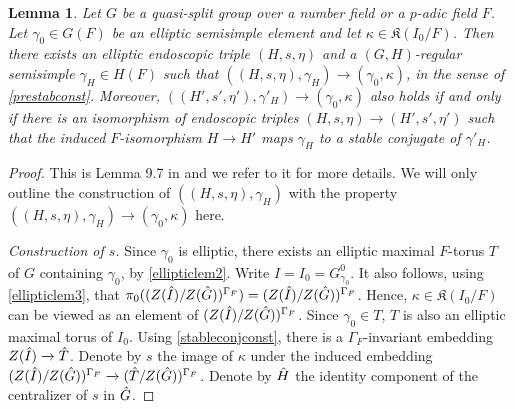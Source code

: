 \documentclass[11pt,a4paper]{article}
\theoremstyle{definition}
\theoremstyle{plain}
\newtheorem{Le}[shared]{Lemma}
\theoremstyle{remark}
\theoremstyle{plain}
\begin{document}
\begin{Le}\label{keylemma}
    Let $G$ be a quasi-split group over a number field or a $p$-adic field $F$. Let $\gamma_0 \in G(F)$ be an elliptic semisimple element and let $\kappa \in \mathfrak{K}(I_0/F)$. Then there exists an elliptic endoscopic triple $(H,s,\eta)$ and a $(G,H)$-regular semisimple $\gamma_H \in H(F)$ such that $((H,s,\eta), \gamma_H) \rightarrow (\gamma_0, \kappa)$, in the sense of \ref{prestabconst}. Moreover, $((H',s',\eta'),\gamma'_H) \rightarrow (\gamma_0, \kappa)$ also holds if and only if there is an isomorphism of endoscopic triples $(H,s,\eta) \rightarrow (H',s',\eta')$ such that the induced $F$-isomorphism $H \rightarrow H'$ maps $\gamma_H$ to a stable conjugate of $\gamma'_H$.
\end{Le}
\begin{proof}
    This is Lemma 9.7 in \cite{MR858284} and we refer to it for more details. We will only outline the construction of $((H,s,\eta), \gamma_H)$ with the property $((H,s,\eta), \gamma_H) \rightarrow (\gamma_0, \kappa)$ here.
    
    \textit{Construction of $s$.} Since $\gamma_0$ is elliptic, there exists an elliptic maximal $F$-torus $T$ of $G$ containing $\gamma_0$, by \ref{ellipticlem2}. Write $I = I_0 = G_{\gamma_0}^0$. It also follows, using \ref{ellipticlem3}, that $\pi_0((Z(\Hat{I})/Z(\Hat{G}))^{\Gamma_F}) = (Z(\Hat{I})/Z(\Hat{G}))^{\Gamma_F}$. Hence, $\kappa \in \mathfrak{K}(I_0/F)$ can be viewed as an element of $(Z(\Hat{I})/Z(\Hat{G}))^{\Gamma_F}$. Since $\gamma_0 \in T$, $T$ is also an elliptic maximal torus of $I_0$. Using \ref{stableconjconst}, there is a $\Gamma_F$-invariant embedding $Z(\Hat{I}) \xrightarrow[]{} \Hat{T}$. Denote by $s$ the image of $\kappa$ under the induced embedding $(Z(\Hat{I})/ Z(\Hat{G}))^{\Gamma_F} \xrightarrow[]{} (\Hat{T}/Z(\Hat{G}))^{\Gamma_F}$. Denote by $\Hat{H}$ the identity component of the centralizer of $s$ in $\Hat{G}$.
    

\end{proof}
\end{document}
